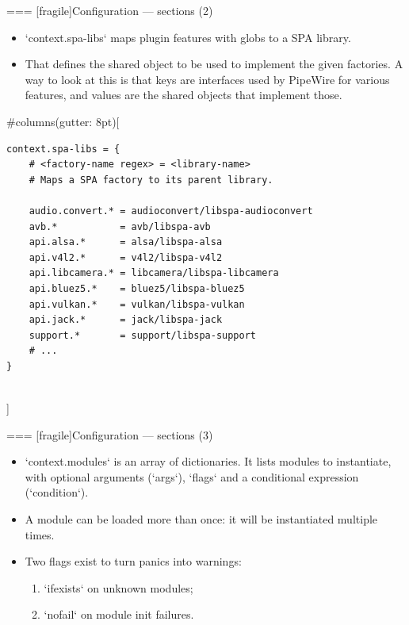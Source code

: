 === [fragile]{Configuration — sections (2)}

  \begin{itemize}
  \item `context.spa-libs` maps plugin features with globs to a SPA
    library.
  \item That defines the shared object to be used to implement the
    given factories. A way to look at this is that keys are interfaces
    used by PipeWire for various features, and values are the shared
    objects that implement those.
  \end{itemize}

  
#columns(gutter: 8pt)[
    \begin{block}{}
      \fontsize{8}{8}\selectfont
        \begin{verbatim}
context.spa-libs = {
    # <factory-name regex> = <library-name>
    # Maps a SPA factory to its parent library.

    audio.convert.* = audioconvert/libspa-audioconvert
    avb.*           = avb/libspa-avb
    api.alsa.*      = alsa/libspa-alsa
    api.v4l2.*      = v4l2/libspa-v4l2
    api.libcamera.* = libcamera/libspa-libcamera
    api.bluez5.*    = bluez5/libspa-bluez5
    api.vulkan.*    = vulkan/libspa-vulkan
    api.jack.*      = jack/libspa-jack
    support.*       = support/libspa-support
    # ...
}
        \end{verbatim}
      \end{block}
  \\]





=== [fragile]{Configuration — sections (3)}

  \begin{itemize}

  \item `context.modules` is an array of dictionaries. It lists
    modules to instantiate, with optional arguments (`args`),
    `flags` and a conditional expression (`condition`).

  \item A module can be loaded more than once: it will be instantiated
    multiple times.

  \item Two flags exist to turn panics into warnings:

    \begin{enumerate}
    \item `ifexists` on unknown modules;
    \item `nofail` on module init failures.
    \end{enumerate}

  \end{itemize}


